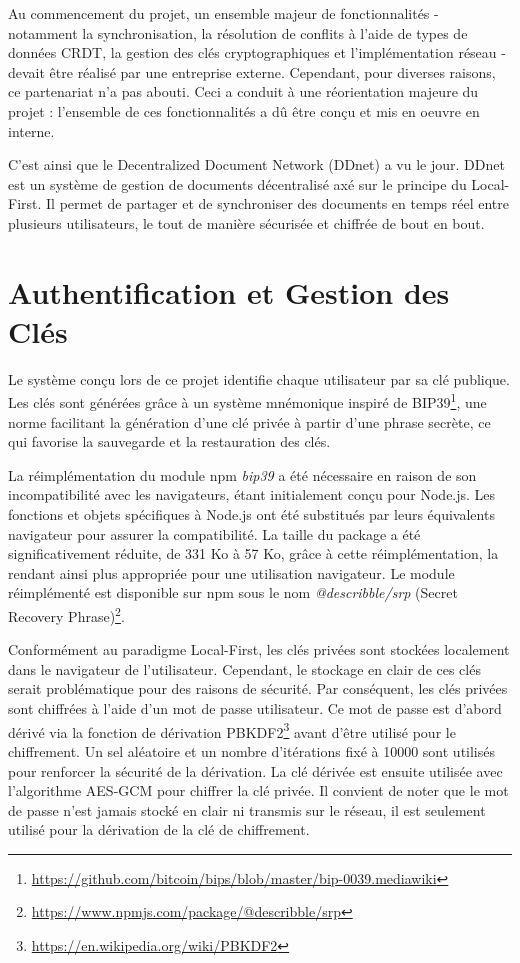 Au commencement du projet, un ensemble majeur de fonctionnalités - notamment la synchronisation, la résolution de conflits à l'aide de types de données \Gls{CRDT}, la gestion des clés cryptographiques et l'implémentation réseau - devait être réalisé par une entreprise externe. Cependant, pour diverses raisons, ce partenariat n'a pas abouti. Ceci a conduit à une réorientation majeure du projet : l'ensemble de ces fonctionnalités a dû être conçu et mis en oeuvre en interne.

C'est ainsi que le Decentralized Document Network (DDnet) a vu le jour. \Gls{DDnet} est un système de gestion de documents décentralisé axé sur le principe du Local-First. Il permet de partager et de synchroniser des documents en temps réel entre plusieurs utilisateurs, le tout de manière sécurisée et chiffrée de bout en bout.

\section{Authentification et Gestion des Clés}

Le système conçu lors de ce projet identifie chaque utilisateur par sa clé publique. Les clés sont générées grâce à un système mnémonique inspiré de BIP39\footnote{\url{https://github.com/bitcoin/bips/blob/master/bip-0039.mediawiki}}, une norme facilitant la génération d'une clé privée à partir d'une phrase secrète, ce qui favorise la sauvegarde et la restauration des clés.

La réimplémentation du module npm \textit{bip39} a été nécessaire en raison de son incompatibilité avec les navigateurs, étant initialement conçu pour Node.js. Les fonctions et objets spécifiques à Node.js ont été substitués par leurs équivalents navigateur pour assurer la compatibilité. La taille du package a été significativement réduite, de 331 Ko à 57 Ko, grâce à cette réimplémentation, la rendant ainsi plus appropriée pour une utilisation navigateur. Le module réimplémenté est disponible sur npm sous le nom \textit{@describble/srp} (Secret Recovery Phrase)\footnote{\url{https://www.npmjs.com/package/@describble/srp}}.

Conformément au paradigme Local-First, les clés privées sont stockées localement dans le navigateur de l'utilisateur. Cependant, le stockage en clair de ces clés serait problématique pour des raisons de sécurité. Par conséquent, les clés privées sont chiffrées à l'aide d'un mot de passe utilisateur. Ce mot de passe est d'abord dérivé via la fonction de dérivation \Gls{PBKDF2}\footnote{\url{https://en.wikipedia.org/wiki/PBKDF2}} avant d'être utilisé pour le chiffrement. Un sel aléatoire et un nombre d'itérations fixé à 10000 sont utilisés pour renforcer la sécurité de la dérivation. La clé dérivée est ensuite utilisée avec l'algorithme AES-GCM pour chiffrer la clé privée. Il convient de noter que le mot de passe n'est jamais stocké en clair ni transmis sur le réseau, il est seulement utilisé pour la dérivation de la clé de chiffrement.

